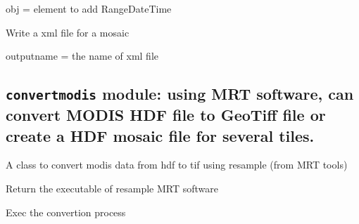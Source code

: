 \documentclass[a4paper,11pt,oneside]{sphinxmanual}
\begin{document}
\begin{fulllineitems}
\begin{fulllineitems}
obj = element to add RangeDateTime

\end{fulllineitems}


\begin{fulllineitems}
\label{pymodis/pymodis:pymodis.parsemodis.parseModisMulti.writexml}
Write a xml file for a mosaic

outputname = the name of xml file

\end{fulllineitems}


\end{fulllineitems}



\subsection{\texttt{convertmodis} module: using MRT software, can convert MODIS HDF file to GeoTiff file or create a HDF mosaic file for several tiles.}
\label{pymodis/pymodis:convertmodis-module-using-mrt-software-can-convert-modis-hdf-file-to-geotiff-file-or-create-a-hdf-mosaic-file-for-several-tiles}\label{pymodis/pymodis:module-pymodis.convertmodis}

\begin{fulllineitems}
\label{pymodis/pymodis:pymodis.convertmodis.convertModis}
A class to convert modis data from hdf to tif using resample
(from MRT tools)

\begin{fulllineitems}
\label{pymodis/pymodis:pymodis.convertmodis.convertModis.executable}
Return the executable of resample MRT software

\end{fulllineitems}


\begin{fulllineitems}
\label{pymodis/pymodis:pymodis.convertmodis.convertModis.run}
Exec the convertion process

\end{fulllineitems}


\end{fulllineitems}
\end{document}
